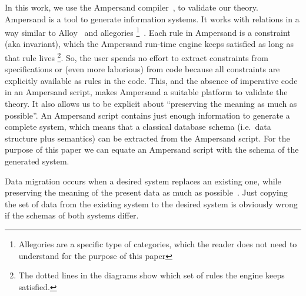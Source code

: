 \documentclass{elsarticle}
\begin{document}
   In this work, we use the Ampersand compiler~\cite{Joosten-JLAMP2018},
   to validate our theory.
   Ampersand is a tool to generate information systems.
   It works with relations in a way similar to Alloy~\cite{Alloy2006} and allegories%
\footnote{Allegories are a specific type of categories, which the reader does not need to understand for the purpose of this paper}~\cite{Zielinski2013}.
   Each rule in Ampersand is a constraint (aka invariant), which the Ampersand run-time engine keeps satisfied as long as that rule lives%
\footnote{The dotted lines in the diagrams show which set of rules the engine keeps satisfied.}.
   So, the user spends no effort to extract constraints from specifications or (even more laborious) from code
   because all constraints are explicitly available as rules in the code.
   This, and the absence of imperative code in an Ampersand script, makes Ampersand a suitable platform to validate the theory.
   It also allows us to be explicit about ``preserving the meaning as much as possible''.
   An Ampersand script contains just enough information to generate a complete system,
   which means that a classical database schema (i.e.\ data structure plus semantics) can be extracted from the Ampersand script.
   For the purpose of this paper we can equate an Ampersand script with the schema of the generated system.

   Data migration occurs when a desired system replaces an existing one,
   while preserving the meaning of the present data as much as possible~\cite{Spivak2012}.
   Just copying the set of data from the existing system to the desired system is obviously wrong if the schemas of both systems differ.
\end{document}

